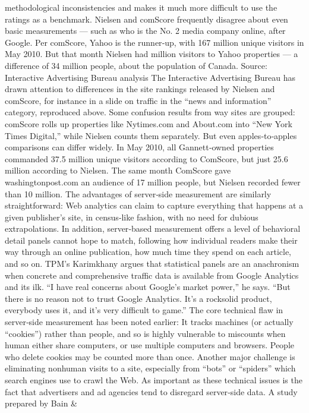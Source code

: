 methodological inconsistencies and makes it much more difficult to use
the ratings as a benchmark. Nielsen and comScore frequently disagree
about even basic measurements — such as who is the No. 2 media
company online, after Google. Per comScore, Yahoo is the runner‐up, with
167 million unique visitors in May 2010. But that month Nielsen had
million visitors to Yahoo properties — a difference of 34 million people,
about the population of Canada.
Source: Interactive Advertising Bureau analysis
The Interactive Advertising Bureau has drawn attention to differences in
the site rankings released by Nielsen and comScore, for instance in a slide
on traffic in the ``news and information'' category, reproduced above.
Some confusion results from way sites are grouped: comScore rolls up
properties like Nytimes.com and About.com into ``New York Times
Digital,'' while Nielsen counts them separately. But even apples‐to‐apples
comparisons can differ widely. In May 2010, all Gannett‐owned properties
commanded 37.5 million unique visitors according to ComScore, but just
25.6 million according to Nielsen. The same month ComScore gave
washingtonpost.com an audience of 17 million people, but Nielsen
recorded fewer than 10 million.
The advantages of server‐side measurement are similarly straightforward:
Web analytics can claim to capture everything that happens at a given
publisher’s site, in census‐like fashion, with no need for dubious
extrapolations. In addition, server‐based measurement offers a level of
behavioral detail panels cannot hope to match, following how individual
readers make their way through an online publication, how much time
they spend on each article, and so on.
TPM’s Karimkhany argues that statistical panels are an anachronism
when concrete and comprehensive traffic data is available from Google
Analytics and its ilk. ``I have real concerns about Google’s market power,''
he says. ``But there is no reason not to trust Google Analytics. It’s a rocksolid
product, everybody uses it, and it’s very difficult to game.''
The core technical flaw in server‐side measurement has been noted earlier:
It tracks machines (or actually ``cookies'') rather than people, and so is
highly vulnerable to miscounts when human either share computers, or
use multiple computers and browsers. People who delete cookies may be
counted more than once. Another major challenge is eliminating nonhuman
visits to a site, especially from ``bots'' or ``spiders'' which search
engines use to crawl the Web.
As important as these technical issues is the fact that advertisers and ad
agencies tend to disregard server‐side data. A study prepared by Bain &
